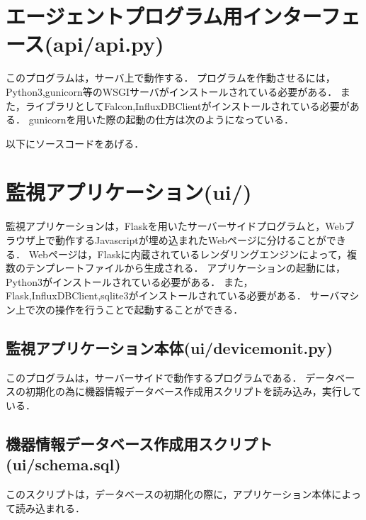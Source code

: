 \section*{エージェントプログラム用インターフェース(api/api.py)}
このプログラムは，サーバ上で動作する．
プログラムを作動させるには，Python3,gunicorn等のWSGIサーバがインストールされている必要がある．
また，ライブラリとしてFalcon,InfluxDBClientがインストールされている必要がある．
gunicornを用いた際の起動の仕方は次のようになっている．

以下にソースコードをあげる．


\section*{監視アプリケーション(ui/)}
監視アプリケーションは，Flaskを用いたサーバーサイドプログラムと，Webブラウザ上で動作するJavascriptが埋め込まれたWebページに分けることができる．
Webページは，Flaskに内蔵されているレンダリングエンジンによって，複数のテンプレートファイルから生成される．
アプリケーションの起動には，Python3がインストールされている必要がある．
また，Flask,InfluxDBClient,sqlite3がインストールされている必要がある．
サーバマシン上で次の操作を行うことで起動することができる．

\subsection*{監視アプリケーション本体(ui/devicemonit.py)}
このプログラムは，サーバーサイドで動作するプログラムである．
データベースの初期化の為に機器情報データベース作成用スクリプトを読み込み，実行している．


\subsection*{機器情報データベース作成用スクリプト(ui/schema.sql)}
このスクリプトは，データベースの初期化の際に，アプリケーション本体によって読み込まれる．



